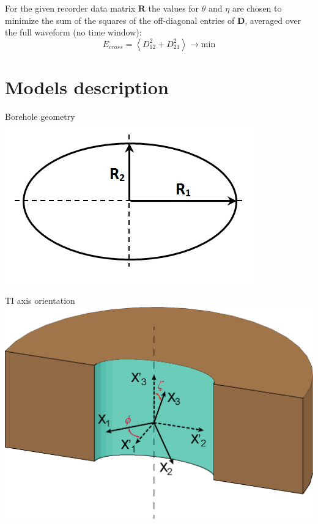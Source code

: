 \documentclass[a4paper,11pt]{article}
\begin{document}
For the given recorder data matrix $\mathbf{R}$ the values for $\theta$ and $\eta$ are chosen to minimize the sum of the squares of the off-diagonal entries of $\mathbf{D}$, averaged over the full waveform (no time window):
$$
	E_{cross} = \left\langle D^2_{12} + D^2_{21} \right\rangle \rightarrow \mathrm{min}
$$

\section{Models description}

\begin{minipage}[c]{0.47\linewidth}	
\begin{center}
		Borehole geometry \\
		\includegraphics[width=1\linewidth]{./images/nonorth_alford/scheme_bh_image_hr.jpg}	  
\end{center}	  		
\end{minipage} \hfill
\begin{minipage}[c]{0.47\linewidth}
\begin{center}
		TI axis orientation\\
			\includegraphics[width=1\linewidth]{./images/nonorth_alford/TI_axes_desc.eps}		
\end{center}
\end{minipage}
\end{document}
